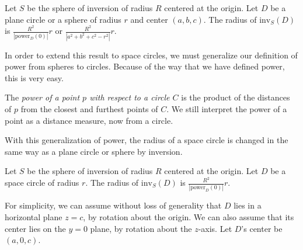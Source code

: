 \begin{lemma}
\label{lem-radius1}
\cite{Coo71}  %
Let $S$ be the sphere of inversion of radius $R$ centered at the origin.
Let $D$ be a plane circle or a sphere of radius $r$ and center $(a,b,c)$.
The radius of $\mbox{inv}_{S}(D)$ is 
$\frac{R^{2}}{|\mbox{power}_{D}(0)|} r$ or
$\frac{R^{2}}{|a^{2} + b^{2} + c^{2} - r^{2}|} r$.
\end{lemma}
% 

In order to extend this result to space circles, we must generalize
our definition of power from spheres to circles.
Because of the way that we have defined power, this is very easy.
%
\begin{definition}
The {\em power of a point $p$ with respect to a circle $C$} is the product of 
the distances of $p$ from the closest and furthest points of $C$.
We still interpret the power of a point as a distance measure, now from 
a circle.
\end{definition}

With this generalization of power, the radius of a space circle 
is changed in the same way as a plane circle or sphere by inversion.

\begin{lemma}
\label{lem-radius2}
Let $S$ be the sphere of inversion of radius $R$ centered at the origin.
Let $D$ be a space circle of radius $r$.
The radius of $\mbox{inv}_{S}(D)$ is $\frac{R^{2}}{|\mbox{power}_{D}(0)|} r$.
\end{lemma}
For simplicity, we can assume without loss of generality that $D$ lies in 
a horizontal plane $z = c$, by rotation about the origin.
We can also assume that its center lies on the $y=0$ plane,
by rotation about the $z$-axis.
Let $D$'s center be $(a,0,c)$.

